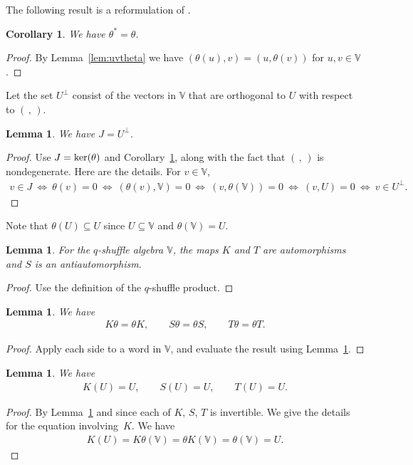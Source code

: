 \documentclass[pdftex]{sigma}
\numberwithin{equation}{section}
\newtheorem{Corollary}[Theorem]{Corollary}
\newtheorem{Lemma}[Theorem]{Lemma}
\begin{document}
The following result is a reformulation of \cite[Theorem~4.5]{green}.
\begin{Corollary}\label{cor:sdtheta}
We have $\theta^*=\theta$.
\end{Corollary}
\begin{proof} By Lemma~\ref{lem:uvtheta} we have $(\theta(u),v)= (u, \theta(v))$ for $u,v \in \mathbb V$.
\end{proof}

Let the set $U^\perp$ consist of the vectors in $\mathbb V$ that are orthogonal to $U$ with respect to
 $(\,,\,)$.
\begin{Lemma}\label{lem:ds}We have $J=U^\perp$.
\end{Lemma}
\begin{proof} Use $J={\rm ker}(\theta)$ and
Corollary~\ref{cor:sdtheta}, along with the fact that $(\,,\,)$ is nondegenerate.
Here are the details. For $v \in \mathbb V$,
\begin{gather*}
v \in J \ \Leftrightarrow\
\theta(v)=0 \ \Leftrightarrow \
( \theta(v),\mathbb V)=0\ \Leftrightarrow \
(v, \theta(\mathbb V))=0 \ \Leftrightarrow\
(v,U)=0 \ \Leftrightarrow \ v \in U^\perp.\tag*{\qed}
\end{gather*}\renewcommand{\qed}{}
\end{proof}

Note that $\theta(U)\subseteq U$ since $U \subseteq \mathbb V$ and $\theta(\mathbb V)=U$.

\begin{Lemma}\label{lem:thetaKTS}For the $q$-shuffle algebra $\mathbb V$, the maps $K$ and $T$
are automorphisms and $S$ is an antiautomorphism.
\end{Lemma}
\begin{proof}Use the definition of the $q$-shuffle product.
\end{proof}

\begin{Lemma}\label{lem:thetaKTS2}We have
\begin{gather*}
K \theta = \theta K, \qquad
S \theta = \theta S, \qquad
T \theta = \theta T.
\end{gather*}
\end{Lemma}
\begin{proof} Apply each side to a word in $\mathbb V$, and evaluate the result using Lemma~\ref{lem:thetaKTS}.
\end{proof}

\begin{Lemma}\label{lem:KSTU}We have
\begin{gather*}
 K (U) = U, \qquad S (U) = U, \qquad T (U) = U.
\end{gather*}
\end{Lemma}
\begin{proof} By Lemma~\ref{lem:thetaKTS2} and since each of $K$, $S$, $T$ is invertible. We give the details for the equation involving~$K$. We have
\begin{gather*}
K(U) = K \theta (\mathbb V) = \theta K(\mathbb V) = \theta(\mathbb V) = U.\tag*{\qed}
\end{gather*}\renewcommand{\qed}{}
\end{proof}
\end{document}
